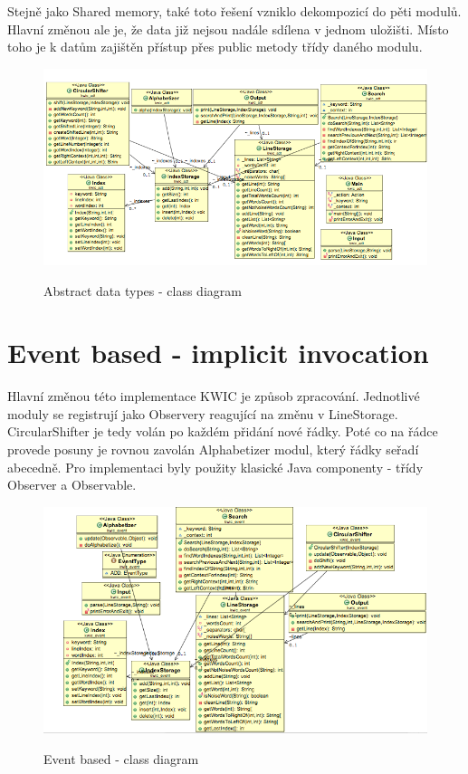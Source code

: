 \documentclass[11pt]{article}
\begin{document}
Stejně jako Shared memory, také toto řešení vzniklo dekompozicí do pěti modulů. Hlavní změnou ale je, že data již nejsou nadále sdílena v jednom uložišti. Místo toho je k datům zajištěn přístup přes public metody třídy daného modulu. 

\begin{figure}[htbp]
	\caption{Abstract data types - class diagram}
		\includegraphics[width=13cm]{adt}
	\label{fig:adt}
\end{figure}

\section{Event based - implicit invocation}

Hlavní změnou této implementace KWIC je způsob zpracování. Jednotlivé moduly se registrují jako Observery reagující na změnu v LineStorage. CircularShifter je tedy volán po každém přidání nové řádky. Poté co na řádce provede posuny je rovnou zavolán Alphabetizer modul, který řádky seřadí abecedně. Pro implementaci byly použity klasické Java componenty - třídy Observer a Observable.

\begin{figure}[htbp]
	\caption{Event based - class diagram}
		\includegraphics[width=13cm]{event}
	\label{fig:event}
\end{figure}
\end{document}
